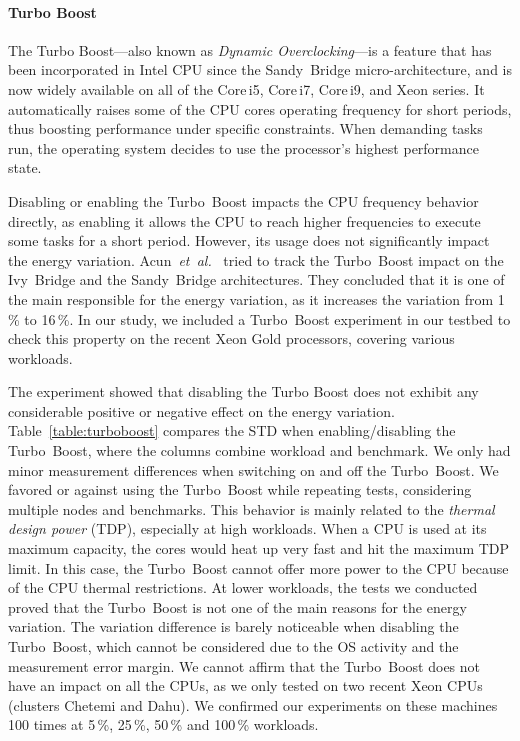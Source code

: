 \paragraph{Turbo Boost}
The Turbo Boost---also known as \emph{Dynamic Overclocking}---is a feature that has been incorporated in Intel CPU since the Sandy~Bridge micro-architecture, and is now widely available on all of the Core\,i5, Core\,i7, Core\,i9, and Xeon series.
It automatically raises some of the CPU cores operating frequency for short periods, thus boosting performance under specific constraints.
When demanding tasks run, the operating system decides to use the processor's highest performance state.

Disabling or enabling the Turbo~Boost  impacts the CPU frequency behavior directly, as enabling it allows the CPU to reach higher frequencies to execute some tasks for a short period.
However, its usage does not significantly impact the energy variation.
Acun~\emph{et~al.}~\cite{acun_variation_2016} tried to track the Turbo~Boost impact on the Ivy~Bridge and the Sandy~Bridge architectures.
They concluded that it is one of the main responsible for the energy variation, as it increases the variation from 1\,\% to 16\,\%.
In our study, we included a Turbo~Boost experiment in our testbed to check this property on the recent Xeon Gold processors, covering various workloads.

The experiment showed that disabling the Turbo Boost does not exhibit any considerable positive or negative effect on the energy variation.
Table~\ref{table:turboboost} compares the STD when enabling/disabling the Turbo~Boost, where the columns combine workload and benchmark.
We only had minor measurement differences when switching on and off the Turbo~Boost. We favored or against using the Turbo~Boost while repeating tests, considering multiple nodes and benchmarks.
This behavior is mainly related to the \emph{thermal design power} (TDP), especially at high workloads.
When a CPU is used at its maximum capacity, the cores would heat up very fast and hit the maximum TDP limit.
In this case, the Turbo~Boost cannot offer more power to the CPU because of the CPU thermal restrictions.
At lower workloads, the tests we conducted proved that the Turbo~Boost is not one of the main reasons for the energy variation.
The variation difference is barely noticeable when disabling the Turbo~Boost, which cannot be considered due to the OS activity and the measurement error margin.
We cannot affirm that the Turbo~Boost does not have an impact on all the CPUs, as we only tested on two recent Xeon CPUs (clusters \textsf{Chetemi} and \textsf{Dahu}).
We confirmed our experiments on these machines 100 times at 5\,\%, 25\,\%, 50\,\% and 100\,\% workloads.

